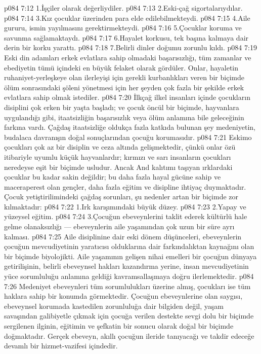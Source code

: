 \vs p084 7:12 1.\bibnobreakspace İşçiler olarak değerliydiler.
\vs p084 7:13 2.\bibnobreakspace Eski\hyp{}çağ sigortalarıydılar.
\vs p084 7:14 3.\bibnobreakspace Kız çocuklar üzerinden para elde edilebilmekteydi.
\vs p084 7:15 4.\bibnobreakspace Aile gururu, ismin yayılmasını gerektirmekteydi.
\vs p084 7:16 5.\bibnobreakspace Çocuklar koruma ve savunma sağlamaktaydı.
\vs p084 7:17 6.\bibnobreakspace Hayalet korkusu, tek başına kalmaya dair derin bir korku yarattı.
\vs p084 7:18 7.\bibnobreakspace Belirli dinler doğumu zorunlu kıldı.
\vs p084 7:19 Eski din adamları erkek evlatlara sahip olmadaki başarısızlığı, tüm zamanlar ve ebediyetin tümü içindeki en büyük felaket olarak gördüler. Onlar, hayaletin ruhaniyet\hyp{}yerleşkeye olan ilerleyişi için gerekli kurbanlıkları veren bir biçimde ölüm sonrasındaki şöleni yönetmesi için her şeyden çok fazla bir şekilde erkek evlatlara sahip olmak istediler.
\vs p084 7:20 İlkçağ ilkel insanları içinde çocukların disiplini çok erken bir yaşta başladı; ve çocuk öncül bir biçimde, hayvanlara uygulandığı gibi, itaatsizliğin başarısızlık veya ölüm anlamına bile geleceğinin farkına vardı. Çağdaş itaatsizliğe oldukça fazla katkıda bulunan şey medeniyetin, budalaca davranışın doğal sonuçlarından çocuğu korumasıdır.
\vs p084 7:21 Eskimo çocukları çok az bir disiplin ve ceza altında gelişmektedir, çünkü onlar özü itibariyle uyumlu küçük hayvanlardır; kırmızı ve sarı insanların çocukları neredeyse eşit bir biçimde usludur. Ancak And kalıtımı taşıyan ırklardaki çocuklar bu kadar sakin değildir; bu daha fazla hayal gücüne sahip ve maceraperest olan gençler, daha fazla eğitim ve disipline ihtiyaç duymaktadır. Çocuk yetiştirilimindeki çağdaş sorunları, şu nedenler artan bir biçimde zor kılmaktadır:
\vs p084 7:22 1.\bibnobreakspace Irk karışımındaki büyük düzey.
\vs p084 7:23 2.\bibnobreakspace Yapay ve yüzeysel eğitim.
\vs p084 7:24 3.\bibnobreakspace Çocuğun ebeveynlerini taklit ederek kültürlü hale gelme olanaksızlığı --- ebeveynlerin aile yaşamından çok uzun bir süre ayrı kalması.
\vs p084 7:25 Aile disiplinine dair eski dönem düşünceleri, ebeveynlerin çocuğun mevcudiyetinin yaratıcısı olduklarına dair farkındalıktan kaynağını olan bir biçimde biyolojikti. Aile yaşamının gelişen nihai emelleri bir çocuğun dünyaya getirilişinin, belirli ebeveynsel hakları kazandırma yerine, insan mevcudiyetinin yüce sorumluluğu anlamına geldiği kavramsallaşmaya doğru ilerlemektedir.
\vs p084 7:26 Medeniyet ebeveynleri tüm sorumlulukları üzerine almış, çocukları ise tüm haklara sahip bir konumda görmektedir. Çocuğun ebeveynlerine olan saygısı, ebeveynsel korumada kastedilen zorunluluğa dair bilgiden değil, yaşam savaşından galibiyetle çıkmak için çocuğa verilen destekte sevgi dolu bir biçimde sergilenen ilginin, eğitimin ve şefkatin bir sonucu olarak doğal bir biçimde doğmaktadır. Gerçek ebeveyn, akıllı çocuğun ileride tanıyacağı ve takdir edeceğe devamlı bir hizmet\hyp{}vazifesi içindedir.
